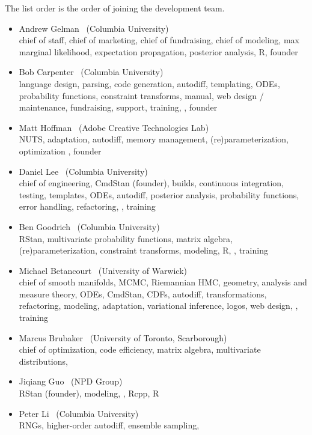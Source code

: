 The list order is the order of joining the development team.

\begin{itemize}
\item Andrew Gelman \ (Columbia University)
\\ {\footnotesize chief of staff, chief of marketing, chief of
  fundraising, chief of modeling, max marginal likelihood,
  expectation propagation,  posterior analysis, R, founder}
\item Bob Carpenter \ (Columbia University) \\ {\footnotesize language
    design, parsing, code generation, autodiff, templating, ODEs,
    probability functions, constraint transforms, manual, web design /
    maintenance, fundraising, support, training, \Cpp, founder}
\item Matt Hoffman \ (Adobe Creative Technologies Lab)
\\ {\footnotesize NUTS, adaptation, autodiff, memory management,
  (re)parameterization, optimization \Cpp, founder}
\item Daniel Lee \   (Columbia University)
\\ {\footnotesize chief of engineering, CmdStan (founder), builds, continuous
  integration, testing, templates, ODEs, autodiff,
  posterior analysis, probability functions, error handling,
  refactoring, \Cpp, training}
\item Ben Goodrich \   (Columbia University)
\\ {\footnotesize RStan, multivariate probability functions, matrix algebra,
  (re)parameterization, constraint transforms, modeling, R, \Cpp, training}
\item Michael Betancourt \ (University of Warwick) \\
  {\footnotesize chief of smooth manifolds, MCMC, Riemannian HMC,
    geometry, analysis and measure theory, ODEs, CmdStan, CDFs,
    autodiff, transformations, refactoring, modeling, adaptation, variational
    inference, logos, web design, \Cpp, training}
\item Marcus Brubaker \   (University of Toronto, Scarborough)
\\ {\footnotesize chief of optimization, code efficiency, matrix
  algebra, multivariate distributions, \Cpp}
\item Jiqiang Guo \   (NPD Group)
\\ {\footnotesize RStan (founder), modeling, \Cpp, Rcpp, R}
\item Peter Li \   (Columbia University)
\\ {\footnotesize RNGs, higher-order autodiff, ensemble sampling,
}
\end{itemize}
